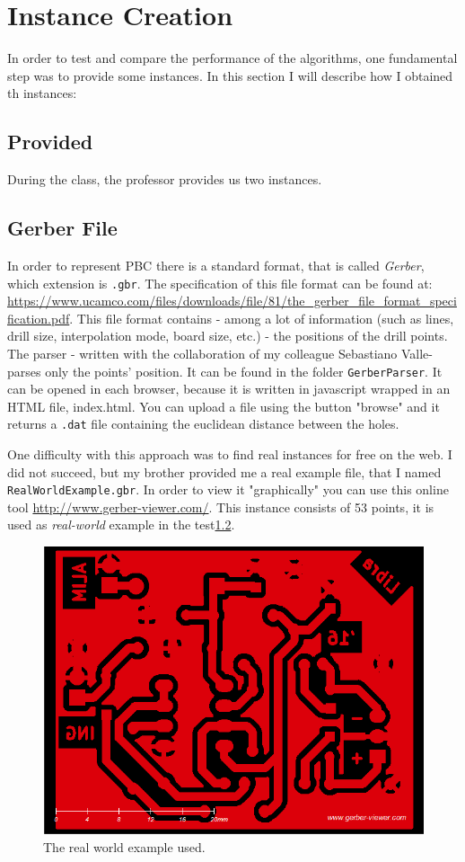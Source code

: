 \section{Instance Creation}
In order to test and compare the performance of the algorithms, one fundamental step
was to provide some instances.
In this section I will describe how I obtained th instances:
\subsection{Provided}
During the class, the professor provides us two instances.
\subsection{Gerber File}

In order to represent PBC there is a standard format, that is called \emph{Gerber}, which extension is \verb|.gbr|.
The specification of this file format can be found at: \url{https://www.ucamco.com/files/downloads/file/81/the_gerber_file_format_specification.pdf}. This file format
contains - among a lot of information (such as lines, drill size, interpolation mode, board size, etc.) -
the positions of the drill points.
The parser - written with the collaboration of my colleague Sebastiano Valle- parses only the points' position. It can be found in the folder \verb|GerberParser|. It can be opened in each browser, because it is written in javascript wrapped in an HTML file, index.html.
You can upload a file using the button "browse" and it returns a \verb|.dat| file containing the euclidean distance between the holes.

One difficulty with this approach was to find real instances for free on the web. I did not succeed, but my brother provided me a real example file, that I named
\verb|RealWorldExample.gbr|. In order to view it "graphically" you can use this online tool \url{http://www.gerber-viewer.com/}.
This instance consists of 53 points, it is used as \emph{real-world} example in the test\ref{}.

\begin{figure}[ht!]
	\centering
	\includegraphics[scale=0.3]{img/real_world.png}
	\caption{The real world example used.}
\end{figure}

